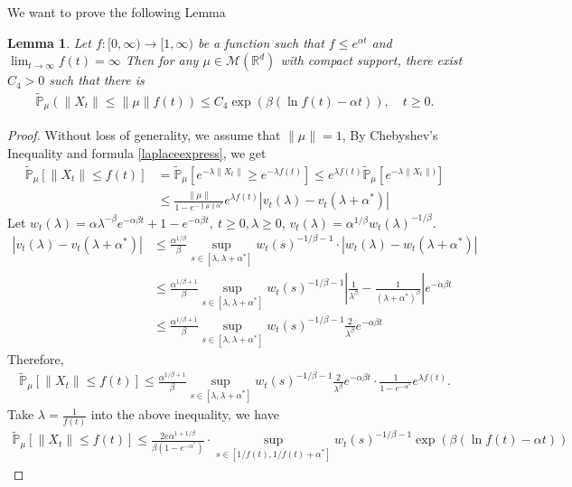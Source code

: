 \documentclass[12pt,oneside,english]{amsart}
\theoremstyle{plain}
\newtheorem{lem}[thm]{Lemma}
\theoremstyle{definition}
\numberwithin{equation}{section}
\begin{document}
We want to prove the following Lemma
\begin{lem}\label{lemma2_13}
Let $f:[0,\infty)\rightarrow[1,\infty)$ be a function such that $f\leq e^{\alpha t}$ and $\lim_{t\rightarrow \infty}f(t)=\infty$ Then for any $\mu\in \mathcal M(\mathbb R^d)$ with compact support, there exist $C_4>0$ such that there is
\begin{align}
    \mathbb{\tilde{P}}_{\mu}(\|X_t\|\leq \|\mu\|f(t))\leq C_4 \exp(\beta(\ln f(t)-\alpha t)), \quad t\geq 0.
\end{align}
\end{lem}
\begin{proof}
 Without loss of generality, we assume that $\|\mu\|=1$, By Chebyshev's Inequality and formula \eqref{laplaceexpress}, we get
\begin{align*}
    \mathbb{\tilde{P}}_{\mu}[\|X_t\|\leq f(t)]&=\mathbb{\tilde{P}}_{\mu}[e^{-\lambda\|X_t\|}\geq e^{-\lambda f(t)}]\leq e^{\lambda f(t)}\mathbb{\tilde{P}}_{\mu}[e^{-\lambda \|X_t\|)}]\\
    &\leq \frac{\|\mu\|}{1-e^{-\|\mu\|\alpha^*}}e^{\lambda f(t)}\left|v_t(\lambda)-v_t(\lambda+\alpha^*)\right|
\end{align*}
Let $w_t(\lambda)=\alpha \lambda^{-\beta}e^{-\alpha \beta t}+1-e^{-\alpha\beta t},~ t\geq 0,\lambda\geq0$, $v_t(\lambda)=\alpha^{1/\beta}w_t(\lambda)^{-1/\beta}$.
\begin{align*}
    \left|v_t(\lambda)-v_t(\lambda+\alpha^*)\right|&\leq\frac {\alpha^{1/\beta}}{\beta}\sup_{s\in [\lambda,\lambda+\alpha^*]}w_t(s)^{-1/\beta-1}\cdot\left|w_t(\lambda)-w_t(\lambda+\alpha^*)\right|\\
    &\leq  \frac{\alpha^{1/\beta+1}}{\beta}\sup_{s\in [\lambda,\lambda+\alpha^*]}w_t(s)^{-1/\beta-1}\left|\frac{1}{\lambda^{\beta}}-\frac{1}{(\lambda+\alpha^*)^{\beta}}\right|e^{-\alpha\beta t}\\
    &\leq  \frac{\alpha^{1/\beta+1}}{\beta}\sup_{s\in [\lambda,\lambda+\alpha^*]}w_t(s)^{-1/\beta-1}\frac{2}{\lambda^{\beta}}e^{-\alpha\beta t}
\end{align*}
Therefore,
\begin{align*}
    \mathbb{\tilde{P}}_{\mu}[\|X_t\|\leq f(t)]\leq \frac{\alpha^{1/\beta+1}}{\beta}\sup_{s\in [\lambda,\lambda+\alpha^*]}w_t(s)^{-1/\beta-1}\frac{2}{\lambda^{\beta}}e^{-\alpha\beta t}\cdot \frac{1}{1-e^{-\alpha^*}} e^{\lambda f(t)}.
\end{align*}
Take $\lambda=\frac{1}{f(t)}$ into the above inequality, we have
\begin{align*}
    \mathbb{\tilde{P}}_{\mu}[\|X_t\|\leq f(t)]\leq \frac{2 e \alpha^{1+1/\beta}}{\beta (1-e^{-\alpha^*})}\cdot\sup_{s\in [1/f(t),1/f(t)+\alpha^*]}w_t(s)^{-1/\beta-1}\exp(\beta(\ln f(t)-\alpha t))

\end{align*}
\end{proof}
\end{document}
